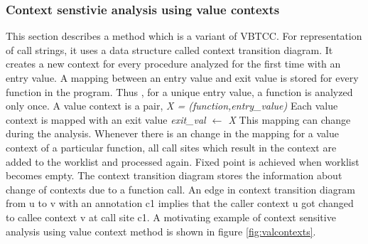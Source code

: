 \documentclass[12pt]{report}
\begin{document}
\subsubsection{Context senstivie analysis using value contexts}

This section describes a method \cite{val} which is a variant of VBTCC. For representation of call strings, it uses a data structure called context transition diagram. It creates a new context for every procedure analyzed for the first time with an entry value. A mapping between an entry value and exit value is stored for every function in the program. Thus , for a unique entry value, a function is analyzed only once. 
A value context is a pair,
\newline
\newline
\emph{X = (function,entry\_value)}
\newline
\newline
Each value context is mapped with an exit value
\newline
\newline
\emph{exit\_val $\leftarrow$ X}
\newline
\newline
This mapping can change during the analysis. Whenever there is an change in the mapping for a value context of a particular function, all call sites which result in the context are added to the worklist and processed again. Fixed point is achieved when worklist becomes empty. The context transition diagram stores the information about change of contexts due to a function call. An edge in context transition diagram from u to v with an annotation c1 implies that the caller context u got changed to callee context v at call site c1. A motivating example of context sensitive analysis using value context method is shown in figure \ref{fig:valcontexts}.
 
\end{document}
